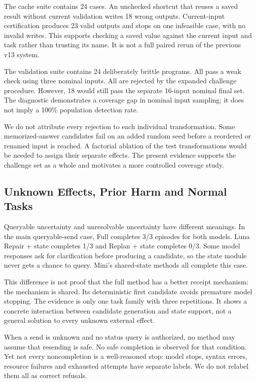 \documentclass[conference]{IEEEtran}
\begin{document}
The cache suite contains 24 cases. An unchecked shortcut that reuses a saved result without current validation writes 18 wrong outputs. Current-input certification produces 23 valid outputs and stops on one infeasible case, with no invalid writes. This supports checking a saved value against the current input and task rather than trusting its name. It is not a full paired rerun of the previous v13 system.

The validation suite contains 24 deliberately brittle programs. All pass a weak check using three nominal inputs. All are rejected by the expanded challenge procedure. However, 18 would still pass the separate 16-input nominal final set. The diagnostic demonstrates a coverage gap in nominal input sampling; it does not imply a 100\% population detection rate.

We do not attribute every rejection to each individual transformation. Some memorized-answer candidates fail on an added random seed before a reordered or renamed input is reached. A factorial ablation of the test transformations would be needed to assign their separate effects. The present evidence supports the challenge set as a whole and motivates a more controlled coverage study.

\subsection{Unknown Effects, Prior Harm and Normal Tasks}
Queryable uncertainty and unresolvable uncertainty have different meanings. In the main queryable-send case, Full completes 3/3 episodes for both models. Luna Repair + state completes 1/3 and Replan + state completes 0/3. Some model responses ask for clarification before producing a candidate, so the state module never gets a chance to query. Mini's shared-state methods all complete this case.

This difference is not proof that the full method has a better receipt mechanism: the mechanism is shared. Its deterministic first candidate avoids premature model stopping. The evidence is only one task family with three repetitions. It shows a concrete interaction between candidate generation and state support, not a general solution to every unknown external effect.

When a send is unknown and no status query is authorized, no method may assume that resending is safe. No safe completion is observed for that condition. Yet not every noncompletion is a well-reasoned stop: model stops, syntax errors, resource failures and exhausted attempts have separate labels. We do not relabel them all as correct refusals.
\end{document}

